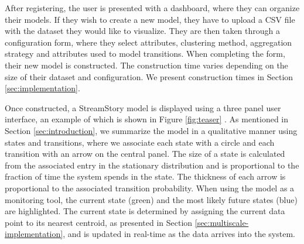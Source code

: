 
\iffalse
Features  
\begin{itemize}
	\item Qualitative representation - states and transitions
	\item State identification services:
	\begin{itemize}
		\item State details and attribute highlighting - histograms + attribute colors
		\item \lstopar{Timeline + parallel coordinates \cite{parcoords} - when do states occur in time}
		\item \lstopar{Coloring states based on attributes}
		\item Decision trees + rule extraction - Explanation of states
		\item Automatic name generation
		\item Zooming into a state + showing paths from a state
	\end{itemize}
\end{itemize}
\fi

After registering, the user is presented with a dashboard, where they can organize their models.
If they wish to create a new model, they have to upload a CSV file with the dataset they would
like to visualize. They are then taken through a configuration form, where they select attributes,
clustering method, aggregation strategy and attributes used to model transitions. When completing
the form, their new model is constructed. The construction time varies depending on the size of 
their dataset and configuration. We present construction times in Section \ref{sec:implementation}.

Once constructed, a StreamStory model is displayed using a three panel user interface, an example of
which is shown in Figure \ref{fig:teaser} . As mentioned
in Section \ref{sec:introduction}, we summarize the model in a qualitative manner using states and 
transitions, where we associate each state with a circle and each transition with an arrow on the 
central panel. The size of a state is calculated from the associated entry in the stationary distribution
and is proportional to the fraction of time the system spends in the state. The thickness of each arrow
is proportional to the associated transition probability. When using the model as a
monitoring tool, the current state (green) and the most likely future states (blue)
are highlighted. The current state is determined by assigning the current data point to its nearest 
centroid, as presented in Section \ref{sec:multiscale-implementation}, and is updated in real-time as
the data arrives into the system.

